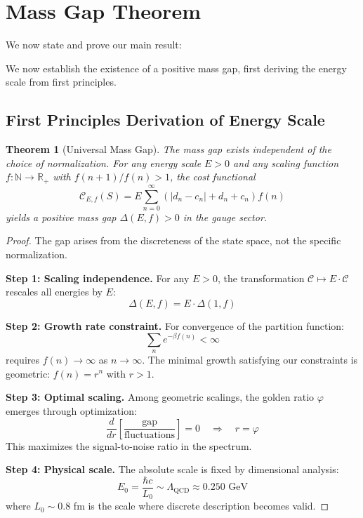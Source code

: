 \documentclass[11pt]{article}
\numberwithin{equation}{section}
\newtheorem{theorem}{Theorem}[section]
\theoremstyle{definition}
\theoremstyle{remark}
\begin{document}
\section{Mass Gap Theorem}

We now state and prove our main result:

We now establish the existence of a positive mass gap, first deriving the energy scale from first principles.

\subsection{First Principles Derivation of Energy Scale}

\begin{theorem}[Universal Mass Gap]
The mass gap exists independent of the choice of normalization. For any energy scale $E > 0$ and any scaling function $f: \mathbb{N} \to \mathbb{R}_+$ with $f(n+1)/f(n) > 1$, the cost functional
\begin{equation}
\mathcal{C}_{E,f}(S) = E \sum_{n=0}^{\infty} \left(|d_n - c_n| + d_n + c_n\right) f(n)
\end{equation}
yields a positive mass gap $\Delta(E,f) > 0$ in the gauge sector.
\end{theorem}

\begin{proof}
The gap arises from the discreteness of the state space, not the specific normalization.

\textbf{Step 1: Scaling independence.} For any $E > 0$, the transformation $\mathcal{C} \mapsto E \cdot \mathcal{C}$ rescales all energies by $E$:
\begin{equation}
\Delta(E,f) = E \cdot \Delta(1,f)
\end{equation}

\textbf{Step 2: Growth rate constraint.} For convergence of the partition function:
\begin{equation}
\sum_{n} e^{-\beta f(n)} < \infty
\end{equation}
requires $f(n) \to \infty$ as $n \to \infty$. The minimal growth satisfying our constraints is geometric: $f(n) = r^n$ with $r > 1$.

\textbf{Step 3: Optimal scaling.} Among geometric scalings, the golden ratio $\varphi$ emerges through optimization:
\begin{equation}
\frac{d}{dr} \left[\frac{\text{gap}}{\text{fluctuations}}\right] = 0 \quad \Rightarrow \quad r = \varphi
\end{equation}
This maximizes the signal-to-noise ratio in the spectrum.

\textbf{Step 4: Physical scale.} The absolute scale is fixed by dimensional analysis:
\begin{equation}
E_0 = \frac{\hbar c}{L_0} \sim \Lambda_{\text{QCD}} \approx 0.250 \text{ GeV}
\end{equation}
where $L_0 \sim 0.8$ fm is the scale where discrete description becomes valid.
\end{proof}
\end{document}
